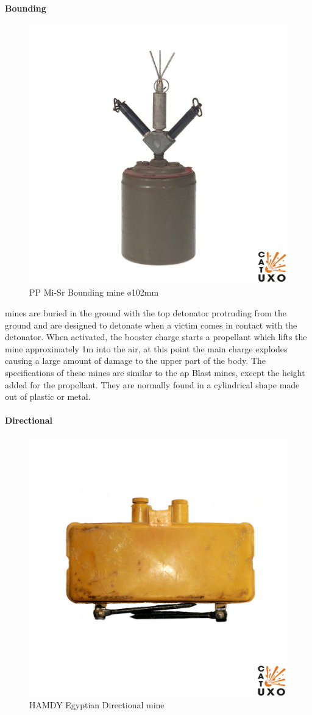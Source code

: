 \paragraph{Bounding}

\begin{figure}
\vspace{-8mm}
\centering
\includegraphics[width=0.5\linewidth]{tex/00 - Images/pp-mi-sr-001.jpg}
  \caption{PP Mi-Sr Bounding mine ø102mm\cite{pp-mi-sr}}
  \label{fig:pp-mi-sr}
\end{figure}

mines are buried in the ground with the top detonator protruding from the ground and are designed to detonate when a victim comes in contact with the detonator. When activated, the booster charge starts a propellant which lifts the mine approximately 1m into the air, at this point the main charge explodes causing a large amount of damage to the upper part of the body. The specifications of these mines are similar to the \gls{ap} Blast mines, except the height added for the propellant. They are normally found in a cylindrical shape made out of plastic or metal. \cite{mine_detection}


\paragraph{Directional}

\begin{figure}
\vspace{-8mm}
\centering
\includegraphics[width=0.5\linewidth]{tex/00 - Images/hamd-y-001.jpg}
  \caption{HAMDY Egyptian Directional mine \cite{hamdy}}
  \label{fig:hamdy}
\end{figure}

